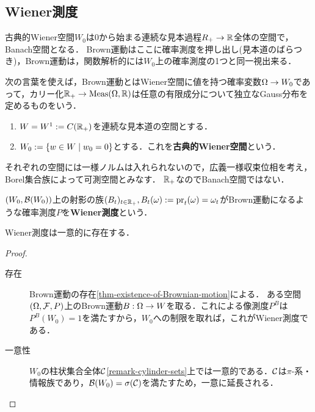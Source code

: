 \documentclass[uplatex,dvipdfmx]{jsreport}
\begin{document}
\subsection{Wiener測度}

\begin{tcolorbox}[colframe=ForestGreen, colback=ForestGreen!10!white,breakable,colbacktitle=ForestGreen!40!white,coltitle=black,fonttitle=\bfseries\sffamily,
title=]
    古典的Wiener空間$W_0$は$0$から始まる連続な見本過程$R_+\to\mathbb{R}$全体の空間で，Banach空間となる．
    Brown運動はここに確率測度を押し出し(見本道のばらつき)，Brown運動は，関数解析的には$W_0$上の確率測度の1つと同一視出来る．
\end{tcolorbox}

\begin{notation}
    次の言葉を使えば，Brown運動とはWiener空間に値を持つ確率変数$\Omega\to W_0$であって，カリー化$\mathbb{R}_+\to\mathrm{Meas}(\Omega,\mathbb{R})$は任意の有限成分について独立なGauss分布を定めるものをいう．
    \begin{enumerate}
        \item $W=W^1:=C(\mathbb{R}_+)$を連続な見本道の空間とする．
        \item $W_0:=\left\{w\in W\mid w_0=0\right\}$とする．これを\textbf{古典的Wiener空間}という．
    \end{enumerate}
    それぞれの空間には一様ノルムは入れられないので，広義一様収束位相を考え，Borel集合族によって可測空間とみなす．
    $\mathbb{R}_+$なのでBanach空間ではない．
\end{notation}

\begin{definition}
    $(W_0,\mathcal{B}(W_0))$上の射影の族$(B_t)_{t\in\mathbb{R}_+},B_t(\omega):=\mathrm{pr}_t(\omega)=\omega_t$がBrown運動になるような確率測度$P$を\textbf{Wiener測度}という．
\end{definition}

\begin{lemma}
    Wiener測度は一意的に存在する．
\end{lemma}
\begin{proof}\mbox{}
    \begin{description}
        \item[存在] Brown運動の存在\ref{thm-existence-of-Brownian-motion}による．
        ある空間$(\Omega,\mathcal{F},P)$上のBrown運動$B:\Omega\to W$を取る．これによる像測度$P^B$は$P^B(W_0)=1$を満たすから，$W_0$への制限を取れば，これがWiener測度である．
        \item[一意性] $W_0$の柱状集合全体$\mathcal{C}$\ref{remark-cylinder-sets}上では一意的である．$\mathcal{C}$は$\pi$-系・情報族であり，$\mathcal{B}(W_0)=\sigma(\mathcal{C})$を満たすため，一意に延長される．
    \end{description}
\end{proof}
\end{document}
